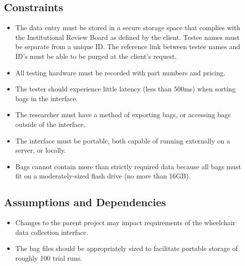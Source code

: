 \documentclass[onecolumn, draftclsnofoot,10pt, compsoc]{IEEEtran}
\begin{document}
\subsection{Constraints}
\begin{itemize}
	\item The data entry must be stored in a secure storage space that complies with the Institutional Review Board as defined by the client.
		\subitem Testee names must be separate from a unique ID.
		\subitem The reference link between testee names and ID's must be able to be purged at the client's request.
	\item All testing hardware must be recorded with part numbers and pricing.
	\item The tester should experience little latency (less than 500ms) when sorting bags in the interface.
	\item The researcher must have a method of exporting bags, or accessing bags outside of the interface.
	\item The interface must be portable, both capable of running externally on a server, or locally.
	\item Bags cannot contain more than strictly required data because all bags must fit on a moderately-sized flash drive (no more than 16GB).
\end{itemize}
\subsection{Assumptions and Dependencies}
\begin{itemize}
	\item Changes to the parent project may impact requirements of the wheelchair data collection interface.
	\item The bag files should be appropriately sized to facilitate portable storage of roughly 100 trial runs.
	
\end{itemize}
\end{document}

